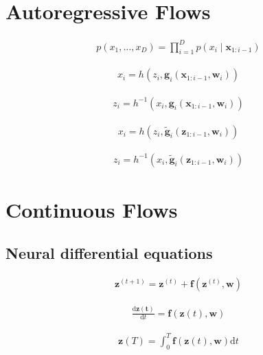 \documentclass{article}
\begin{document}
\section{Autoregressive Flows}

\begin{align*}
p\left(x_{1}, \ldots, x_{D}\right) = \prod_{i=1}^{D} p\left(x_{i} \mid \mathbf{x}_{1: i-1}\right) 
\tag{18.16}
\end{align*}

\begin{align*}
x_{i} = h\left(z_{i}, \mathbf{g}_{i}\left(\mathbf{x}_{1: i-1}, \mathbf{w}_{i}\right)\right) 
\tag{18.17}
\end{align*}

\begin{align*}
z_{i} = h^{-1}\left(x_{i}, \mathbf{g}_{i}\left(\mathbf{x}_{1: i-1}, \mathbf{w}_{i}\right)\right) 
\tag{18.18}
\end{align*}

\begin{align*}
x_{i} = h\left(z_{i}, \widetilde{\mathbf{g}}_{i}\left(\mathbf{z}_{1: i-1}, \mathbf{w}_{i}\right)\right) 
\tag{18.19}
\end{align*}

\begin{align*}
z_{i} = h^{-1}\left(x_{i}, \widetilde{\mathbf{g}}_{i}\left(\mathbf{z}_{1: i-1}, \mathbf{w}_{i}\right)\right) 
\tag{18.20}
\end{align*}

\section{Continuous Flows}

\subsection{Neural differential equations}

\begin{align*}
\mathbf{z}^{(t+1)} = \mathbf{z}^{(t)} + \mathbf{f}\left(\mathbf{z}^{(t)}, \mathbf{w}\right) 
\tag{18.21}
\end{align*}

\begin{align*}
\frac{\mathrm{d} \mathbf{z}(\mathbf{t})}{\mathrm{d} t} = \mathbf{f}(\mathbf{z}(t), \mathbf{w}) 
\tag{18.22}
\end{align*}

\begin{align*}
\mathbf{z}(T) = \int_{0}^{T} \mathbf{f}(\mathbf{z}(t), \mathbf{w}) \mathrm{d} t 
\tag{18.23}
\end{align*}
\end{document}
